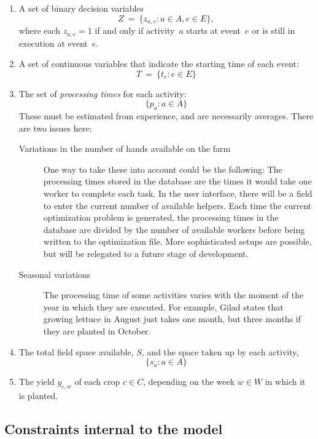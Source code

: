 \documentclass[11pt,reqno]{amsart}
\numberwithin{equation}{section}
\begin{document}
\begin{enumerate}
\item A set of binary decision variables 
  \[
     Z
     \ = \
     \big\{z_{a,e}: a\in A, e\in E\big\},
  \]
  where each $z_{a,e}=1$ if and only if activity~$a$ starts at
  event~$e$ or is still in execution at event~$e$.

\smallskip
\item A set of continuous variables that indicate the starting time of each event:
  \[
     T
     \ = \
     \big\{t_e : e\in E\big\}
  \]

\smallskip
\item The set of \emph{processing times} for each activity:
  \[
      \{p_a:a\in A\}
  \]  
  These must be estimated from experience, and are necessarily averages. There are two
  issues here:
  \begin{description}
  \item[Variations in the number of hands available on the farm] One way to take these
    into account could be the following: The processing times stored in the database are
    the times it would take one worker to complete each task. In the user interface, there
    will be a field to enter the current number of available helpers. Each time the
    current optimization problem is generated, the processing times in the database are
    divided by the number of available workers before being written to the optimization
    file. More sophisticated setups are possible, but will be relegated to a future stage
    of development.

  \item[Seasonal variations] The processing time of some activities varies with the moment
    of the year in which they are executed. For example, Gilad states that growing lettuce
    in August just takes one month, but three months if they are planted in October.
  \end{description}
  \smallskip
\item The total field space available, $S$, and the space taken up
  by each activity,
  \[
      \{s_a : a\in A\}
  \]

\smallskip
\item The yield $y_{c,w}$ of each crop $c\in C$, depending on the week $w\in W$ in which
  it is planted.

\end{enumerate}

\subsection{Constraints internal to the model}
\end{document}
